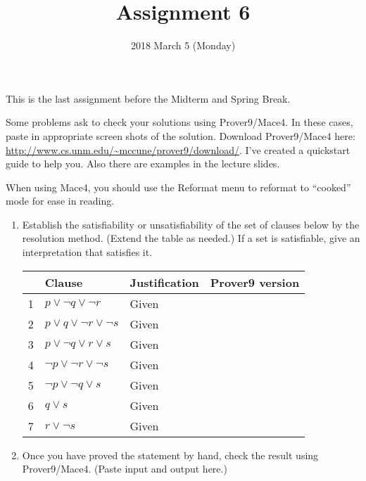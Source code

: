 \documentclass{cs81-homework}
\title{Assignment 6}
\author{}
\date{2018 March 5 (Monday)}
\begin{document}
\begin{introduction}
  This is the last assignment before the Midterm and Spring Break.

  \theintroduction

  Some problems ask to check your solutions using Prover9/Mace4. In these cases,
  paste in appropriate screen shots of the solution.  Download Prover9/Mace4
  here: \url{http://www.cs.unm.edu/~mccune/prover9/download/}.  I've created a
  quickstart guide to help you.  Also there are examples in the lecture slides.

  When using Mace4, you should use the Reformat menu to reformat to ``cooked''
  mode for ease in reading.
\end{introduction}

\begin{enumerate}

\item {} Establish the satisfiability or unsatisfiability of the set of
  clauses below by the resolution method.  (Extend the table as needed.)  If a
  set is satisfiable, give an interpretation that satisfies it.
  
  \begin{solution}
    \begin{center}
      \begin{tabular}{|l||l|l|l|}
        \hline
        & Clause & Justification & Prover9 version \\
        \hline\hline
        1 & \(p \lor \lnot q \lor \lnot r\) & Given & \\ \hline
        2 & \(p \lor q \lor \lnot r \lor \lnot s\) & Given & \\ \hline
        3 & \(p \lor \lnot q \lor r \lor s\) & Given & \\ \hline
        4 & \(\lnot p \lor \lnot r \lor \lnot s\) & Given & \\ \hline
        5 & \(\lnot p \lor \lnot q \lor s\) & Given & \\ \hline
        6 & \(q \lor s\) & Given & \\ \hline
        7 & \( r \lor \lnot s\) & Given & \\
        \hline
      \end{tabular}
    \end{center}
  \end{solution}
  
\item[]  Once you have proved the statement by hand, check the result
  using Prover9/Mace4.  (Paste input and output here.)


\end{enumerate}
\end{document}
